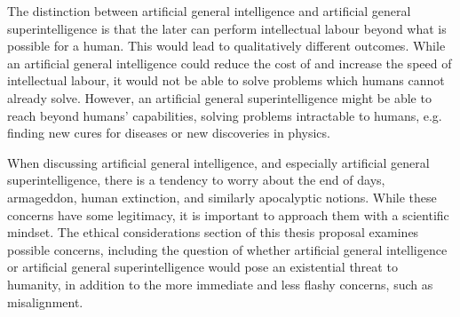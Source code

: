 \documentclass[12pt]{report}
\begin{document}
The distinction between artificial general intelligence and artificial general superintelligence is that the later can perform intellectual labour beyond what is possible for a human.
This would lead to qualitatively different outcomes.
While an artificial general intelligence could reduce the cost of and increase the speed of intellectual labour, it would not be able to solve problems which humans cannot already solve.
However, an artificial general superintelligence might be able to reach beyond humans' capabilities, solving problems intractable to humans, e.g. finding new cures for diseases or new discoveries in physics.

When discussing artificial general intelligence, and especially artificial general superintelligence, there is a tendency to worry about the end of days, armageddon, human extinction, and similarly apocalyptic notions.
While these concerns have some legitimacy, it is important to approach them with a scientific mindset.
The ethical considerations section of this thesis proposal examines possible concerns, including the question of whether artificial general intelligence or artificial general superintelligence would pose an existential threat to humanity, in addition to the more immediate and less flashy concerns, such as misalignment.
\end{document}
